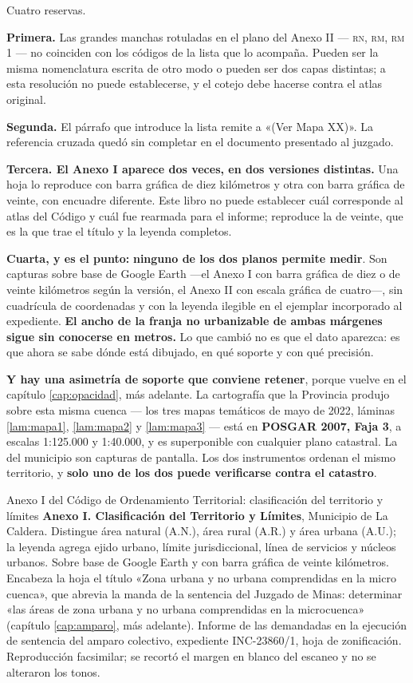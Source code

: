 \begin{cautela}
Cuatro reservas.

\textbf{Primera.} Las grandes manchas rotuladas en el plano del Anexo II --- \textsc{rn},
\textsc{rm}, \textsc{rm 1} --- no coinciden con los códigos de la lista que lo acompaña.
Pueden ser la misma nomenclatura escrita de otro modo o pueden ser dos capas distintas; a esta
resolución no puede establecerse, y el cotejo debe hacerse contra el atlas original.

\textbf{Segunda.} El párrafo que introduce la lista remite a «(Ver Mapa XX)». La referencia
cruzada quedó sin completar en el documento presentado al juzgado.

\textbf{Tercera. El Anexo I aparece dos veces, en dos versiones distintas.} Una hoja lo reproduce con
barra gráfica de diez kilómetros y otra con barra gráfica de veinte, con encuadre diferente.
Este libro no puede establecer cuál corresponde al atlas del Código y cuál fue rearmada para el
informe; reproduce la de veinte, que es la que trae el título y la leyenda completos.

\textbf{Cuarta, y es el punto:} \textbf{ninguno de los dos planos permite medir}. Son capturas
sobre base de Google Earth ---el Anexo I con barra gráfica de diez o de veinte kilómetros según la versión, el Anexo II con escala gráfica de cuatro---, sin cuadrícula de
coordenadas y con la leyenda ilegible en el ejemplar incorporado al expediente. \textbf{El
ancho de la franja no urbanizable de ambas márgenes sigue sin conocerse en metros.} Lo que
cambió no es que el dato aparezca: es que ahora se sabe dónde está dibujado, en qué soporte y
con qué precisión.
\end{cautela}

\textbf{Y hay una asimetría de soporte que conviene retener}, porque vuelve en el capítulo \ref{cap:opacidad}, más adelante.
La cartografía que la Provincia produjo sobre esta misma cuenca --- los tres mapas temáticos
de mayo de 2022, láminas \ref{lam:mapa1}, \ref{lam:mapa2} y \ref{lam:mapa3} --- está en
\textbf{POSGAR 2007, Faja 3}, a escalas 1:125.000 y 1:40.000, y es superponible con cualquier
plano catastral. La del municipio son capturas de pantalla. Los dos instrumentos ordenan el
mismo territorio, y \textbf{solo uno de los dos puede verificarse contra el catastro}.

%
{Anexo I del Código de Ordenamiento Territorial: clasificación del territorio y límites}%
{\textbf{Anexo I. Clasificación del Territorio y Límites}, Municipio de La Caldera. Distingue
área natural (A.N.), área rural (A.R.) y área urbana (A.U.); la leyenda agrega ejido urbano,
límite jurisdiccional, línea de servicios y núcleos urbanos. Sobre base de Google Earth y con
barra gráfica de veinte kilómetros. Encabeza la hoja el título «Zona urbana y no urbana
comprendidas en la micro cuenca», que abrevia la manda de la sentencia del Juzgado de Minas:
determinar «las áreas de zona urbana y no urbana comprendidas en la microcuenca»
(capítulo \ref{cap:amparo}, más adelante).}%
{Informe de las demandadas en la ejecución de sentencia del amparo colectivo, expediente
INC-23860/1, hoja de zonificación. Reproducción facsimilar; se recortó el margen en blanco del
escaneo y no se alteraron los tonos.}

